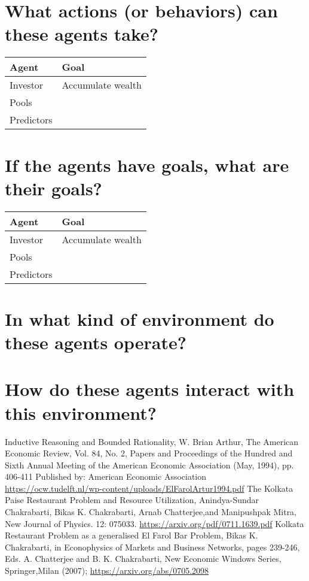 \documentclass[]{article}
\begin{document}
\section{What actions (or behaviors) can these agents take?}

\begin{tabular}{|l|l|} \hline
	Agent&Goal\\ \hline
	Investor & Accumulate wealth\\ \hline
	Pools & \\ \hline
	Predictors & \\ \hline
\end{tabular}
\section{If the agents have goals, what are their goals?}

\begin{tabular}{|l|l|} \hline
	Agent&Goal\\ \hline
	Investor & Accumulate wealth\\ \hline
	Pools & \\ \hline
	Predictors & \\ \hline
\end{tabular}


\section{In what kind of environment do these agents operate?}
\section{How do these agents interact with this environment?}

\begin{thebibliography}{9}
Inductive Reasoning and Bounded Rationality,
W. Brian Arthur,
The American Economic Review, 
Vol. 84, No. 2, Papers and Proceedings of the
Hundred and Sixth Annual Meeting of the American Economic Association (May, 1994), pp. 406-411
Published by: American Economic Association
\url{https://ocw.tudelft.nl/wp-content/uploads/ElFarolArtur1994.pdf}
The Kolkata Paise Restaurant Problem and Resource Utilization,
Anindya-Sundar Chakrabarti, Bikas K. Chakrabarti, Arnab Chatterjee,and Manipushpak Mitra,
New Journal of Physics. 12: 075033. 
\url{https://arxiv.org/pdf/0711.1639.pdf}
Kolkata Restaurant Problem as a generalised El Farol Bar Problem,
Bikas K. Chakrabarti,
in Econophysics of Markets and Business Networks, pages 239-246, Eds. A. Chatterjee and B. K. Chakrabarti, New Economic Windows Series, Springer,Milan (2007);
\url{https://arxiv.org/abs/0705.2098}
\end{thebibliography}
\end{document}
